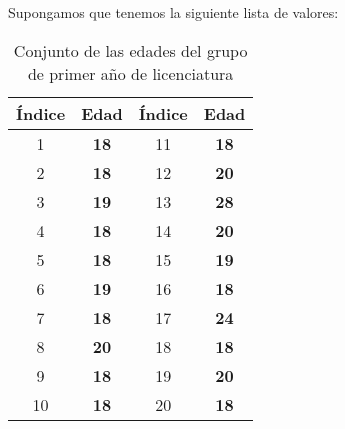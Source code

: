 \documentclass{article}
\begin{document}
Supongamos que tenemos la siguiente lista de valores:
\begin{table}[h!]
    \centering
    \begin{tabular}{|c|c|c|c|}
    \hline
    \textbf{Índice} & \textbf{Edad} & \textbf{Índice} & \textbf{Edad} \\ \hline
    1 & \textbf{18} & 11 & \textbf{18}  \\ \hline
    2 & \textbf{18} & 12 & \textbf{20}  \\ \hline
    3 & \textbf{19} & 13 & \textbf{28}  \\ \hline
    4 & \textbf{18} & 14 & \textbf{20}  \\ \hline
    5 & \textbf{18} & 15 & \textbf{19}  \\ \hline
    6 & \textbf{19} & 16 & \textbf{18}  \\ \hline
    7 & \textbf{18} & 17 & \textbf{24}  \\ \hline
    8 & \textbf{20} & 18 & \textbf{18}  \\ \hline
    9 & \textbf{18} & 19 & \textbf{20}  \\ \hline
    10 & \textbf{18} & 20 & \textbf{18}  \\ \hline
    \end{tabular}
    \caption{Conjunto de las edades del grupo de primer año de licenciatura}
\end{table}

\clearpage
\end{document}
